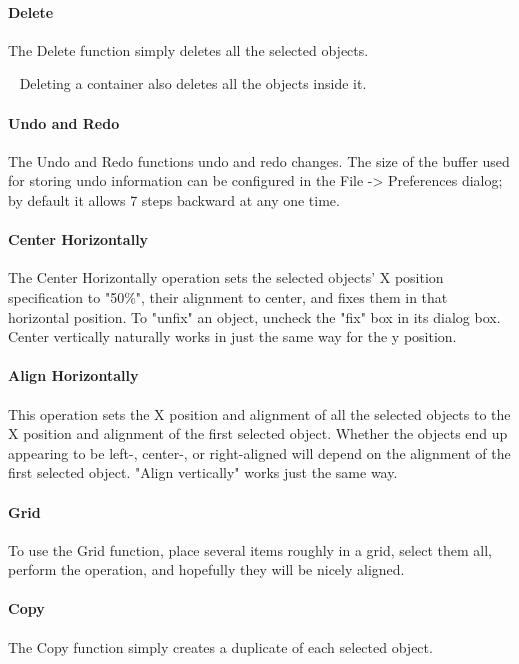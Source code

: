 \paragraph{Delete}
The Delete function simply deletes all the selected objects.

\medskip{}\ {\sffamily
Deleting a container also deletes all the objects inside it.}\medskip

\paragraph{Undo and Redo}
The Undo and Redo functions undo and redo changes. The size of the
buffer used for storing undo information can be configured in the File
-{\textgreater} Preferences dialog; by default it allows 7 steps
backward at any one time.

\paragraph[Center Horizontally]{Center Horizontally}
The Center Horizontally operation sets the selected
objects' X position specification to
"50\%", their alignment to center, and
fixes them in that horizontal position. To
"unfix" an object, uncheck the
"fix" box in its dialog box. Center
vertically naturally works in just the same way for the y position.

\paragraph{Align Horizontally}
This operation sets the X position and alignment
of all the selected objects to the X position and alignment of
the first selected object. Whether the objects end up appearing to be
left-, center-, or right-aligned will depend on the alignment of the
first selected object. "Align vertically"
works just the same way.

\paragraph{Grid}
To use the Grid function, place several items roughly in a grid, select
them all, perform the operation, and hopefully they will be nicely
aligned.

\paragraph{Copy}
The Copy function simply creates a duplicate of each selected object.

